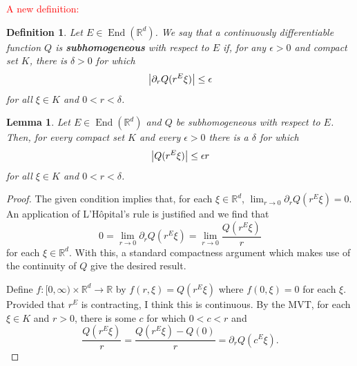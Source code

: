 \documentclass[11pt]{article}
\newtheorem{lemma}[theorem]{Lemma}
\newtheorem{definition}[theorem]{Definition}
\newcommand\End{\operatorname{End}} %
\begin{document}
\textcolor{red}{A new definition:}
\begin{definition}
Let $E\in\End(\mathbb{R}^d)$. We say that a continuously differentiable function $Q$ is \textbf{subhomogeneous} with respect to $E$ if, for any $\epsilon>0$ and compact set $K$, there is $\delta>0$ for which
\begin{equation*}
   \abs{\partial_r Q(r^E\xi)}\leq \epsilon
\end{equation*}
for all $\xi\in K$ and $0<r<\delta$.
\end{definition}
\begin{lemma}
Let $E\in\End(\mathbb{R}^d)$ and $Q$ be subhomogeneous with respect to $E$. Then, for every compact set $K$ and every $\epsilon>0$ there is a $\delta$ for which
\begin{equation*}
\abs{Q(r^E\xi)}\leq \epsilon r
\end{equation*}
for all $\xi\in K$ and $0<r<\delta$.
\end{lemma}
\begin{proof}
The given condition implies that, for each $\xi\in \mathbb{R}^d$, $\lim_{r\to 0}\partial_r Q(r^E\xi)=0$. An application of L'H\^{o}pital's rule is justified and we find that
\begin{equation*}
    0=\lim_{r\to 0}\partial_r Q(r^E\xi)=\lim_{r\to 0}\frac{Q(r^E\xi)}{r}
\end{equation*}
for each $\xi\in\mathbb{R}^d$. With this, a standard compactness argument which makes use of the continuity of $Q$ give the desired result.

Define $f:[0,\infty)\times \mathbb{R}^d\to \mathbb{R}$ by $f(r,\xi)=Q(r^E\xi)$ where $f(0,\xi)=0$ for each $\xi$. Provided that $r^E$ is contracting, I think this is continuous. By the MVT, for each $\xi\in K$ and $r>0$, there is some $c$ for which $0<c<r$ and 
\begin{equation*}
    \frac{Q(r^E\xi)}{r}=\frac{Q(r^E\xi)-Q(0)}{r}=\partial_r Q(c^E\xi).
\end{equation*}
\end{proof}
\end{document}
